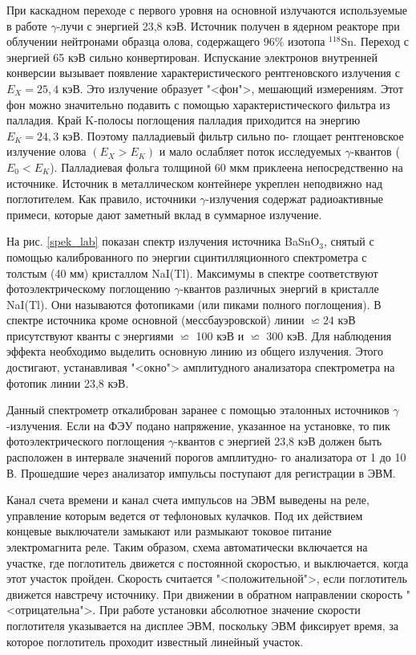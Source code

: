 \documentclass[12pt]{kiarticle}
\begin{document}
	
	При каскадном переходе с первого
	уровня на основной излучаются используемые в работе $ \gamma $-лучи с энергией 23,8 кэВ.
	Источник получен в ядерном реакторе при
	облучении нейтронами образца олова, содержащего 96\% изотопа
	$ ^{118} $Sn. Переход с энергией 65 кэВ сильно конвертирован. Испускание электронов внутренней конверсии вызывает появление характеристического рентгеновского излучения с $ E_X = 25,4 $ кэВ. Это излучение образует "<фон">, мешающий измерениям. Этот фон можно значительно подавить с помощью характеристического фильтра
	из палладия. Край K-полосы поглощения палладия приходится на
	энергию $ E_K = 24,3 $ кэВ. Поэтому палладиевый фильтр сильно по-
	глощает рентгеновское излучение олова $ (E_X > E_K) $ и мало ослабляет поток исследуемых $ \gamma $-квантов ($ E_0 < E_K $). Палладиевая фольга
	толщиной 60 мкм приклеена непосредственно на источнике. Источник в металлическом контейнере укреплен неподвижно над поглотителем. Как правило, источники $ \gamma $-излучения содержат радиоактивные примеси, которые дают заметный вклад в суммарное излучение.

	На рис. \ref{spek_lab} показан спектр излучения источника BaSnO$_3 $, снятый с помощью калиброванного по энергии сцинтилляционного спектрометра с толстым (40 мм) кристаллом NaI(Tl). Максимумы в спектре
	соответствуют фотоэлектрическому поглощению $ \gamma $-квантов различных энергий в кристалле NaI(Tl). Они называются фотопиками (или
	пиками полного поглощения). В спектре источника кроме основной
	(мессбауэровской) линии $ \backsimeq 24 $ кэВ присутствуют кванты с энергиями $ \backsimeq $ 100 кэВ и $ \backsimeq  $ 300 кэВ. Для наблюдения эффекта необходимо выделить основную линию из общего излучения. Этого достигают, устанавливая "<окно"> амплитудного анализатора спектрометра на фотопик линии 23,8 кэВ.
	
	Данный спектрометр откалиброван заранее с помощью эталонных
	источников $ \gamma $-излучения. Если на ФЭУ подано напряжение, указанное на установке, то пик фотоэлектрического поглощения $ \gamma $-квантов с энергией 23,8 кэВ
	должен быть расположен в интервале значений порогов амплитудно-
	го анализатора от 1 до 10 В. Прошедшие через анализатор импульсы
	поступают для регистрации в ЭВМ.
	
	Канал счета времени и канал счета импульсов на ЭВМ выведены
	на реле, управление которым ведется от тефлоновых кулачков. Под их
	действием концевые выключатели замыкают или размыкают токовое
	питание электромагнита реле. Таким образом, схема автоматически
	включается на участке, где поглотитель движется с постоянной скоростью, и выключается, когда этот участок пройден. Скорость считается "<положительной">, если поглотитель движется навстречу источнику.
	При движении в обратном направлении скорость "<отрицательна">. При
	работе установки абсолютное значение скорости поглотителя указывается на дисплее ЭВМ, поскольку ЭВМ фиксирует время, за которое
	поглотитель проходит известный линейный участок.
	
\end{document}
